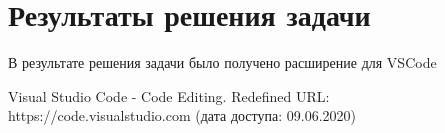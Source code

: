 \documentclass[14pt, a4paper]{diplom}
\begin{document}
\chapter{Результаты решения задачи}

В результате решения задачи было получено расширение для VSCode


\renewcommand{\bibname}{Список литературы}
\begin{thebibliography}{9}

Visual Studio Code - Code Editing. Redefined
URL: https://code.visualstudio.com
(дата доступа: 09.06.2020)

\end{thebibliography}
\end{document}
